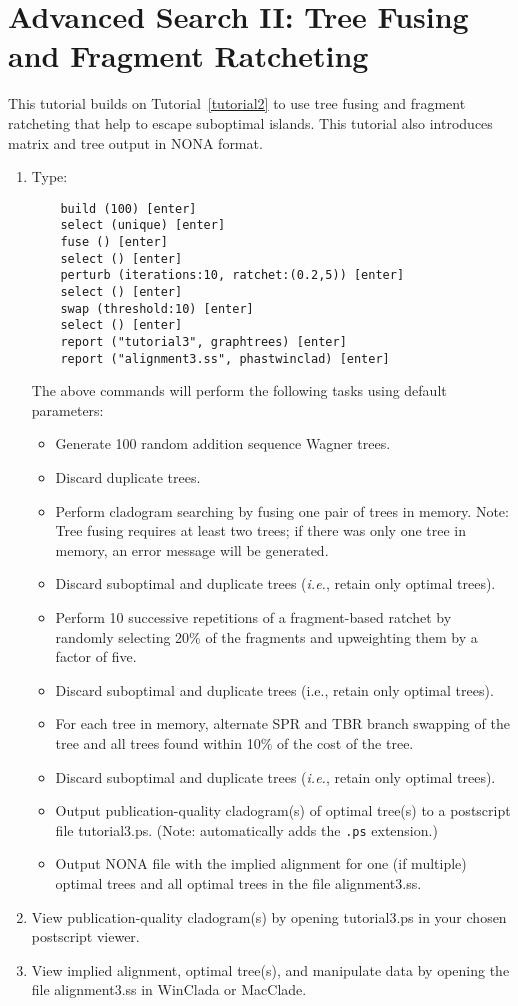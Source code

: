 \section[Fusing and Ratcheting]{Advanced Search II: Tree Fusing and Fragment
Ratcheting}{\label{tutorial3}}

This tutorial builds on Tutorial~\ref{tutorial2} to use tree fusing and fragment ratcheting 
that help to escape suboptimal islands. This tutorial also introduces matrix and 
tree output in NONA format.

\begin{enumerate}
\item Type: 
\begin{verbatim}
    build (100) [enter]
    select (unique) [enter]
    fuse () [enter]
    select () [enter]
    perturb (iterations:10, ratchet:(0.2,5)) [enter]
    select () [enter]
    swap (threshold:10) [enter]
    select () [enter]
    report ("tutorial3", graphtrees) [enter]
    report ("alignment3.ss", phastwinclad) [enter]
\end{verbatim}

The above commands will perform the following tasks using default parameters:
\begin{itemize}
\item Generate 100 random addition sequence Wagner trees.
\item Discard duplicate trees.
\item Perform cladogram searching by fusing one pair of trees in memory. Note: Tree 
fusing requires at least two trees; if there was only one tree in memory, 
an error message will be generated. 
\item Discard suboptimal and duplicate trees (\emph{i.e.}, retain only optimal trees).
\item Perform 10 successive repetitions of a fragment-based ratchet by randomly 
selecting 20\% of the fragments and upweighting them by a factor of five.
\item Discard suboptimal and duplicate trees (i.e., retain only optimal trees).
\item For each tree in memory, alternate SPR and TBR branch swapping of the tree 
and all trees found within 10\% of the cost of the tree.
\item Discard suboptimal and duplicate trees (\emph{i.e.}, retain only optimal trees).
\item Output publication-quality cladogram(s) of optimal tree(s) to a postscript 
file tutorial3.ps. (Note: \poy automatically adds the \texttt{.ps} extension.)
\item Output NONA file with the implied alignment for one (if multiple) optimal 
trees and all optimal trees in the file alignment3.ss.
\end{itemize}

\item View publication-quality cladogram(s) by opening tutorial3.ps in your chosen 
postscript viewer.
\item View implied alignment, optimal tree(s), and manipulate data by opening the 
file alignment3.ss in WinClada or MacClade.

\end{enumerate}

